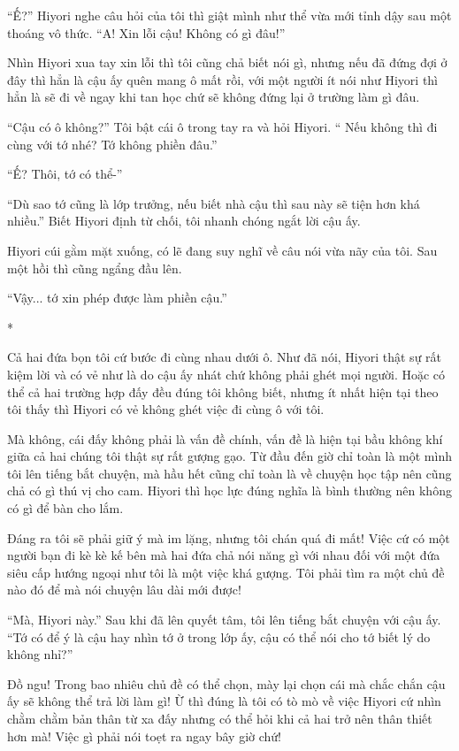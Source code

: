 {``Ế?'' Hiyori nghe câu hỏi của tôi thì giật mình như thể vừa mới tỉnh
dậy sau một thoáng vô thức. ``A! Xin lỗi cậu! Không có gì đâu!''

Nhìn Hiyori xua tay xin lỗi thì tôi cũng chả biết nói gì, nhưng nếu đã
đứng đợi ở đây thì hẳn là cậu ấy quên mang ô mất rồi, với một người ít
nói như Hiyori thì hẳn là sẽ đi về ngay khi tan học chứ sẽ không đứng
lại ở trường làm gì đâu.

``Cậu có ô không?'' Tôi bật cái ô trong tay ra và hỏi Hiyori. `` Nếu
không thì đi cùng với tớ nhé? Tớ không phiền đâu.''

``Ế? Thôi, tớ có thể-''

``Dù sao tớ cũng là lớp trưởng, nếu biết nhà cậu thì sau này sẽ tiện hơn
khá nhiều.'' Biết Hiyori định từ chối, tôi nhanh chóng ngắt lời cậu ấy.

Hiyori cúi gằm mặt xuống, có lẽ đang suy nghĩ về câu nói vừa nãy của
tôi. Sau một hồi thì cũng ngẩng đầu lên.

``Vậy... tớ xin phép được làm phiền cậu.''

*

Cả hai đứa bọn tôi cứ bước đi cùng nhau dưới ô. Như đã nói, Hiyori thật
sự rất kiệm lời và có vẻ như là do cậu ấy nhát chứ không phải ghét mọi
người. Hoặc có thể cả hai trường hợp đấy đều đúng tôi không biết, nhưng
ít nhất hiện tại theo tôi thấy thì Hiyori có vẻ không ghét việc đi cùng
ô với tôi.

Mà không, cái đấy không phải là vấn đề chính, vấn đề là hiện tại bầu
không khí giữa cả hai chúng tôi thật sự rất gượng gạo. Từ đầu đến giờ
chỉ toàn là một mình tôi lên tiếng bắt chuyện, mà hầu hết cũng chỉ toàn
là về chuyện học tập nên cũng chả có gì thú vị cho cam. Hiyori thì học
lực đúng nghĩa là bình thường nên không có gì để bàn cho lắm.

Đáng ra tôi sẽ phải giữ ý mà im lặng, nhưng tôi chán quá đi mất! Việc cứ
có một người bạn đi kè kè kế bên mà hai đứa chả nói năng gì với nhau đối
với một đứa siêu cấp hướng ngoại như tôi là một việc khá gượng. Tôi phải
tìm ra một chủ đề nào đó để mà nói chuyện lâu dài mới được!

``Mà, Hiyori này.'' Sau khi đã lên quyết tâm, tôi lên tiếng bắt chuyện
với cậu ấy. ``Tớ có để ý là cậu hay nhìn tớ ở trong lớp ấy, cậu có thể
nói cho tớ biết lý do không nhỉ?''

Đồ ngu! Trong bao nhiêu chủ đề có thể chọn, mày lại chọn cái mà chắc
chắn cậu ấy sẽ không thể trả lời làm gì! Ừ thì đúng là tôi có tò mò về
việc Hiyori cứ nhìn chằm chằm bản thân từ xa đấy nhưng có thể hỏi khi cả
hai trở nên thân thiết hơn mà! Việc gì phải nói toẹt ra ngay bây giờ
chứ!

}
